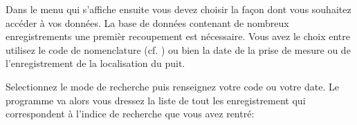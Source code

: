 \documentclass[letterpaper,10pt,french]{sphinxmanual}
\begin{document}
\sphinxAtStartPar
Dans le menu  qui s’affiche ensuite vous devez choisir la façon dont vous souhaitez accéder à vos données.
La base de données  contenant de nombreux enregistrements une premièr recoupement est nécessaire. Vous avez le choix entre utilisez
le code de nomenclature (cf. {\hyperref[\detokenize{bones:skeleton}]{}}) ou bien la date de la prise de mesure ou de l’enregistrement de la localisation du puit.

\sphinxAtStartPar
Selectionnez le mode de recherche puis renseignez votre code ou votre date. Le programme va alors vous dressez la liste de tout les enregistrement qui
correspondent à l’indice de recherche que vous avez rentré:
\end{document}
